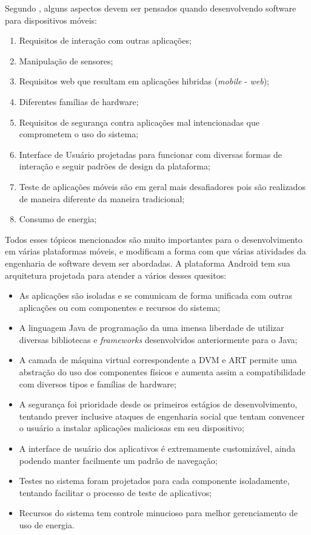 Segundo , alguns aspectos devem ser pensados quando desenvolvendo software para dispositivos móveis:

\begin{enumerate}
\item Requisitos de interação com outras aplicações;
\item Manipulação de sensores;
\item Requisitos web que resultam em aplicações hibridas (\textit{mobile} - \textit{web});
\item Diferentes famílias de hardware;
\item Requisitos de segurança contra aplicações mal intencionadas que comprometem o uso do sistema;
\item Interface de Usuário projetadas para funcionar com diversas formas de interação e seguir padrões de design da plataforma;
\item Teste de aplicações móveis são em geral mais desafiadores pois são realizados de maneira diferente da maneira tradicional;
\item Consumo de energia;
\end{enumerate}

Todos esses tópicos mencionados são muito importantes para o desenvolvimento em várias plataformas móveis, e modificam a forma com que várias atividades da engenharia de software devem ser abordadas. A plataforma Android tem sua arquitetura projetada para atender a vários desses quesitos:
\begin{itemize}
\item As aplicações são isoladas e se comunicam de forma unificada com outras aplicações ou com componentes e recursos do sistema;
\item A linguagem Java de programação da uma imensa liberdade de utilizar diversas bibliotecas e \textit{frameworks} desenvolvidos anteriormente para o Java;
\item A camada de máquina virtual correspondente a DVM e ART permite uma abstração do uso dos componentes físicos e aumenta assim a compatibilidade com diversos tipos e famílias de hardware;
\item A segurança foi prioridade desde os primeiros estágios de desenvolvimento, tentando prever inclusive ataques de engenharia social que tentam convencer o usuário a instalar aplicações maliciosas em seu dispositivo;
\item A interface de usuário dos aplicativos é extremamente customizável, ainda podendo manter facilmente um padrão de navegação;
\item Testes no sistema foram projetados para cada componente isoladamente, tentando facilitar o processo de teste de aplicativos;
\item Recursos do sistema tem controle minucioso para melhor gerenciamento de uso de energia.
\end{itemize}

